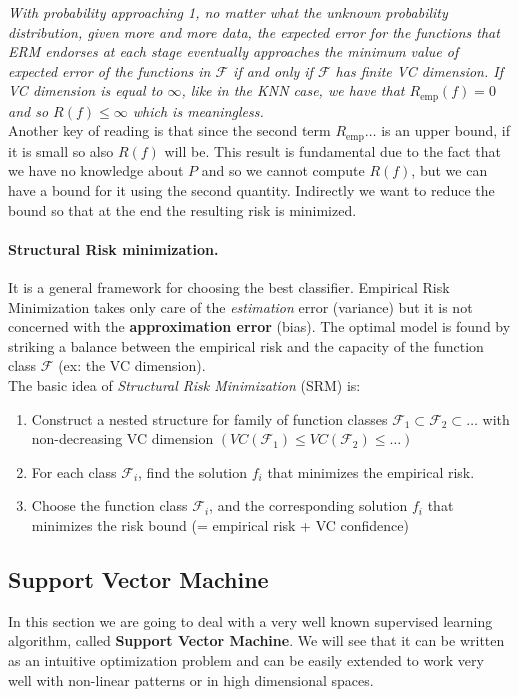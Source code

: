 \textit{With probability approaching  1, no matter what the unknown probability distribution, given more and more data, the expected error for the functions that ERM endorses at each stage eventually approaches the minimum value of expected error of the functions in $\mathcal{ F }$ if and only if $\mathcal{ F }$ has finite VC dimension. If VC dimension is equal to $\infty$, like in the KNN case, we have that $R_\text{emp}(f) = 0$ and so $R(f) \leq \infty$ which is meaningless.}\\

Another key of reading is that since the second term $R_\text{emp}\dots$ is an upper bound, if it is small so also $R(f)$ will be. This result is fundamental due to the fact that we have no knowledge about $P$ and so we cannot compute $R(f)$, but we can have a bound for it using the second quantity. Indirectly we want to reduce the bound so that at the end the resulting risk is minimized.

\paragraph*{Structural Risk minimization.} It is a general framework for choosing the best classifier. Empirical Risk Minimization takes only care of the \textit{estimation} error (variance) but it is not concerned with the \textbf{approximation error} (bias). The optimal model is found by striking a balance between the empirical risk and the capacity of the function class $\mathcal{ F }$ (ex: the VC dimension).\\
The basic idea of \textit{Structural Risk Minimization} (SRM) is:
\begin{enumerate}
	\item Construct a nested structure for family of function classes $\mathcal{ F }_1 \subset \mathcal{ F }_2 \subset \dots$ with non-decreasing VC dimension $(VC(\mathcal{ F }_1) \leq VC(\mathcal{ F }_2) \leq \dots)$
	\item For each class $\mathcal{ F }_i$, find the solution $f_i$ that minimizes the empirical risk.
	\item Choose the function class $\mathcal{ F }_i$, and the corresponding solution $f_i$ that minimizes the risk bound (= empirical risk + VC confidence) 
\end{enumerate}

\newpage
\subsection{Support Vector Machine}
In this section we are going to deal with a very well known supervised learning algorithm, called \textbf{Support Vector Machine}. We will see that it can be written as an intuitive optimization problem and can be easily extended to work very well with non-linear patterns or in high dimensional spaces.\\

